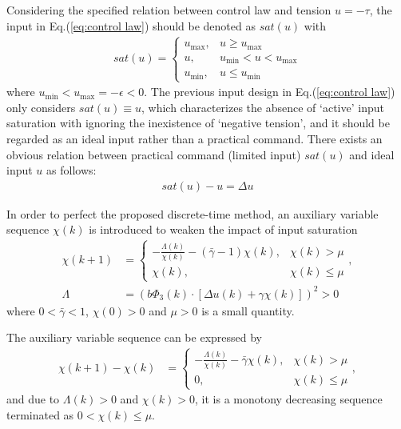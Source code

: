\documentclass[10pt,onecolumn,draftcls]{IEEEtran}
\begin{document}
Considering the specified relation between control law and tension $u=-\tau$, the input in Eq.(\ref{eq:control law}) should be denoted as $sat(u)$ with
\begin{align}
	sat(u)=\left\{
             \begin{array}{ll}
             u_{\max}, &u\ge u_{\max}  \\
             u, & u_{\min}<u<u_{\max}\\
             u_{\min}, &u\le u_{\min}
             \end{array}
\right.
\end{align}
where $u_{\min}<u_{\max}=-\epsilon<0$. The previous input design in Eq.(\ref{eq:control law}) only considers $sat(u)\equiv u$, which characterizes the absence of `active' input saturation with ignoring the inexistence of `negative tension', and it should be regarded as an ideal input rather than a practical command. There exists an obvious relation between practical command (limited input) $sat(u)$ and ideal input $u$ as follows:
\begin{align}
	sat(u)-u = \Delta u
\end{align}

In order to perfect the proposed discrete-time method, an auxiliary variable sequence $\chi(k)$ is introduced to weaken the impact of input saturation
\begin{align}\label{eq:chi}
	\chi(k+1)&=\left\{
             \begin{array}{ll}
             -\frac{\Lambda(k)}{\chi(k)}-(\bar\gamma-1)\chi(k), &\chi(k)>\mu   \\
             \chi(k), & \chi(k)\le \mu
             \end{array},
\right.\\
\Lambda &=\left(b\Phi_3(k)\cdot\left[\Delta u(k)+\gamma\chi(k)\right]\right)^2>0
\end{align}
where $0<\bar\gamma<1$, $\chi(0)>0$ and $\mu>0$ is a small quantity. 

The auxiliary variable sequence can be expressed by 
\begin{align}
	\chi(k+1)-\chi(k)&=\left\{
             \begin{array}{ll}
             -\frac{\Lambda(k)}{\chi(k)}-\bar\gamma\chi(k), &\chi(k)>\mu   \\
             0, & \chi(k)\le \mu
             \end{array},
\right.
\end{align}
and due to $\Lambda(k)>0$ and $\chi(k)>0$, it is a monotony decreasing sequence terminated as $0<\chi(k)\le\mu$. 
\end{document}
